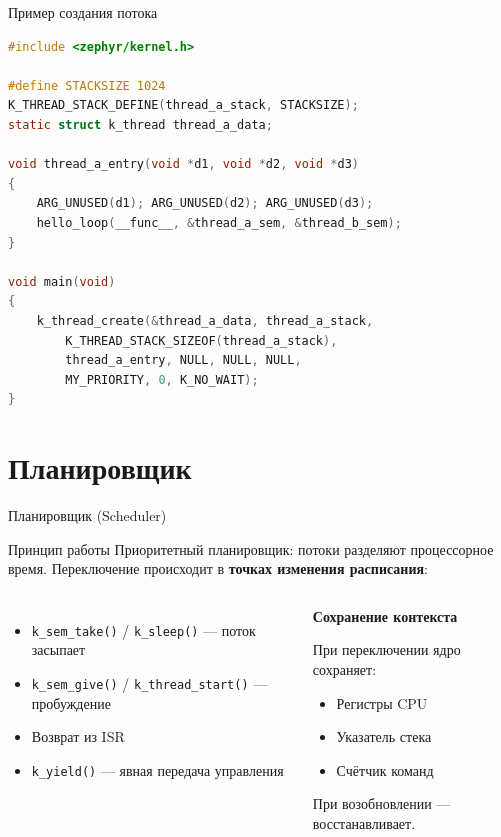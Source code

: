 \documentclass[12pt,aspectratio=169]{beamer}
\begin{document}

\begin{frame}[fragile]{Пример создания потока}
\begin{lstlisting}[language=C]
#include <zephyr/kernel.h>

#define STACKSIZE 1024
K_THREAD_STACK_DEFINE(thread_a_stack, STACKSIZE);
static struct k_thread thread_a_data;

void thread_a_entry(void *d1, void *d2, void *d3)
{
    ARG_UNUSED(d1); ARG_UNUSED(d2); ARG_UNUSED(d3);
    hello_loop(__func__, &thread_a_sem, &thread_b_sem);
}

void main(void)
{
    k_thread_create(&thread_a_data, thread_a_stack,
        K_THREAD_STACK_SIZEOF(thread_a_stack),
        thread_a_entry, NULL, NULL, NULL,
        MY_PRIORITY, 0, K_NO_WAIT);
}
\end{lstlisting}
\end{frame}


\section{Планировщик}

\begin{frame}{Планировщик (Scheduler)}
\begin{block}{Принцип работы}
Приоритетный планировщик: потоки разделяют процессорное время.
Переключение происходит в \textbf{точках изменения расписания}:
\end{block}

\begin{columns}
\begin{itemize}
  \item \texttt{k\_sem\_take()} / \texttt{k\_sleep()} --- поток засыпает
  \item \texttt{k\_sem\_give()} / \texttt{k\_thread\_start()} --- пробуждение
  \item Возврат из ISR
  \item \texttt{k\_yield()} --- явная передача управления
\end{itemize}
\begin{center}
\textbf{Сохранение контекста}

\vspace{6pt}
При переключении ядро сохраняет:
\begin{itemize}
  \item Регистры CPU
  \item Указатель стека
  \item Счётчик команд
\end{itemize}
\vspace{4pt}
При возобновлении --- восстанавливает.
\end{center}
\end{columns}
\end{frame}
\end{document}
